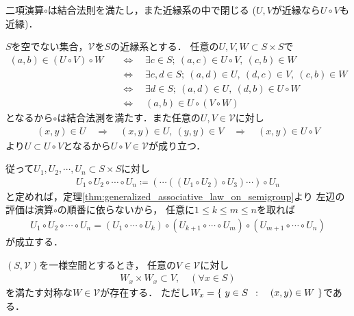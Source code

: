 	\begin{screen}
		\begin{thm}
		\label{thm:uniform_structure_is_a_semigroup}
			二項演算$\circ$は結合法則を満たし，また近縁系の中で閉じる
			($U,V$が近縁なら$U \circ V$も近縁)．
		\end{thm}
	\end{screen}
	
	\begin{prf}
		$S$を空でない集合，$\mathscr{V}$を$S$の近縁系とする．
		任意の$U,V,W \subset S \times S$で
		\begin{align}
			(a,b) \in (U \circ V) \circ W
			&\quad \Longleftrightarrow \quad
			\exists c \in S;\ (a,c) \in U \circ V,\ (c,b) \in W \\
			&\quad \Longleftrightarrow \quad
			\exists c,d \in S;\ (a,d) \in U,\ (d,c) \in V,\ (c,b) \in W \\
			&\quad \Longleftrightarrow \quad
			\exists d \in S;\ (a,d) \in U,\ (d,b) \in U \circ W \\
			&\quad \Longleftrightarrow \quad
			(a,b) \in U \circ (V \circ W)
		\end{align}
		となるから$\circ$は結合法測を満たす．また任意の$U,V \in \mathscr{V}$に対し
		\begin{align}
			(x,y) \in U \quad \Longrightarrow \quad
			(x,y) \in U,\ (y,y) \in V \quad \Longrightarrow \quad
			(x,y) \in U \circ V
		\end{align}
		より$U \subset U \circ V$となるから$U \circ V \in \mathscr{V}$が成り立つ．
		\QED
	\end{prf}
	
	従って$U_1,U_2,\cdots,U_n \subset S \times S$に対し
	\begin{align}
		U_1 \circ U_2 \circ \cdots \circ U_n
		\coloneqq (\cdots((U_1 \circ U_2) \circ U_3) \cdots ) \circ U_n
	\end{align}
	と定めれば，定理\ref{thm:generalized_associative_law_on_semigroup}より
	左辺の評価は演算$\circ$の順番に依らないから，
	任意に$1 \leq k \leq m \leq n$を取れば
	\begin{align}
		U_1 \circ U_2 \circ \cdots \circ U_n
		= (U_1 \circ \cdots \circ U_k) 
		\circ (U_{k+1} \circ \cdots \circ U_m)
		\circ (U_{m+1} \circ \cdots \circ U_n)
	\end{align}
	が成立する．
	
	\begin{screen}
		\begin{thm}\label{thm:uniform_structure}
			$(S,\mathscr{V})$を一様空間とするとき，
			任意の$V \in \mathscr{V}$に対し
			\begin{align}
				W_x \times W_x \subset V,\quad (\forall x \in S)
			\end{align}
			を満たす対称な$W \in \mathscr{V}$が存在する．
			ただし$W_x = \left\{\ y \in S\ \, : \quad (x,y) \in W\ \right\}$である．
		\end{thm}
	\end{screen}
	
